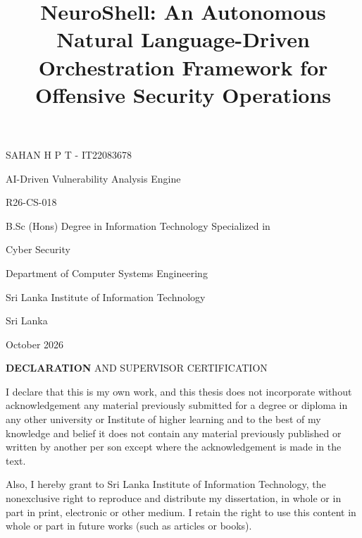 \documentclass[
]{article}
\title{NeuroShell: An Autonomous Natural Language-Driven Orchestration
Framework for Offensive Security Operations}
\author{}
\date{}
\begin{document}
\maketitle

SAHAN H P T - IT22083678

AI-Driven Vulnerability Analysis Engine

R26-CS-018

B.Sc (Hons) Degree in Information Technology Specialized in

Cyber Security

Department of Computer Systems Engineering

Sri Lanka Institute of Information Technology

Sri Lanka

October 2026

\protect\hypertarget{_Toc242376570}{}{}\textbf{DECLARATION} AND
SUPERVISOR CERTIFICATION

I declare that this is my own work, and this thesis does not incorporate
without acknowledgement any material previously submitted for a degree
or diploma in any other university or Institute of higher learning and
to the best of my knowledge and belief it does not contain any material
previously published or written by another per son except where the
acknowledgement is made in the text.

Also, I hereby grant to Sri Lanka Institute of Information Technology,
the nonexclusive right to reproduce and distribute my dissertation, in
whole or in part in print, electronic or other medium. I retain the
right to use this content in whole or part in future works (such as
articles or books).
\end{document}
